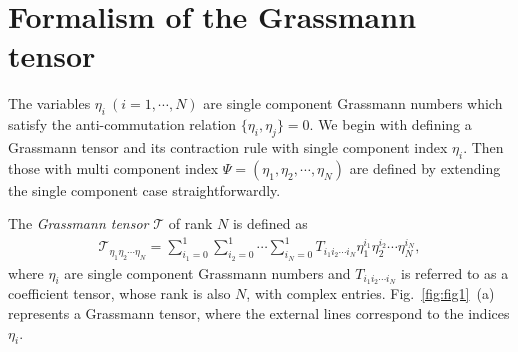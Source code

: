 \section{Formalism of the Grassmann tensor}
\label{sec:formulation}

The variables $\eta_i \ (i=1,\cdots,N) $ are single component Grassmann numbers 
which satisfy the anti-commutation relation 
$ \{\eta_{i},\eta_{j} \}=0 $.
We begin with defining a Grassmann tensor and its contraction rule with single component index $\eta_i$. 
Then those with multi component index $\Psi=(\eta_1,\eta_2,\cdots,\eta_N)$ are defined by extending the single 
component case straightforwardly. 


The {\it Grassmann tensor} $\mathcal{T}$ of rank $N$ is defined as
\begin{align}
\label{eq:def1}
	\mathcal{T}_{\eta_{1}\eta_{2}\cdots\eta_{N}}=\sum_{i_{1}=0}^1 \sum_{i_{2}=0}^1 \cdots \sum_{i_{N}=0}^1 T_{i_{1}i_{2}\cdots i_{N}}\eta_{1}^{i_{1}}\eta_{2}^{i_{2}}\cdots\eta_{N}^{i_{N}},
\end{align}
where %
$\eta_i$ are single component Grassmann numbers
and $T_{i_{1}i_{2}\cdots i_{N}}$ is referred to as a coefficient tensor, 
whose rank is also $N$, with complex entries. 
Fig.~\ref{fig:fig1}~(a) represents a Grassmann tensor, 
where the external lines correspond to the indices $\eta_i$.  


